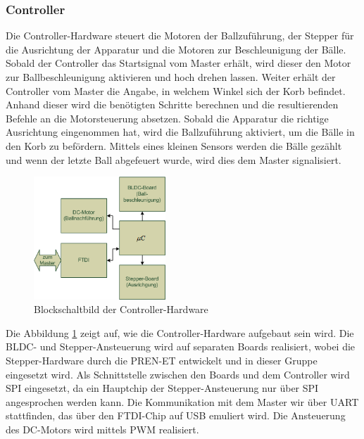 \subsubsection{Controller}
\label{sec:Controller}
	Die Controller-Hardware steuert die Motoren der Ballzuführung, der Stepper für die Ausrichtung der Apparatur und die Motoren zur Beschleunigung der Bälle. Sobald der Controller das Startsignal vom Master erhält, wird dieser den Motor zur Ballbeschleunigung aktivieren und hoch drehen lassen. Weiter erhält der Controller vom Master die Angabe, in welchem Winkel sich der Korb befindet. Anhand dieser wird die benötigten Schritte berechnen und die resultierenden Befehle an die Motorsteuerung absetzen. Sobald die Apparatur die richtige Ausrichtung eingenommen hat, wird die Ballzuführung aktiviert, um die Bälle in den Korb zu befördern. Mittels eines kleinen Sensors werden die Bälle gezählt und wenn der letzte Ball abgefeuert wurde, wird dies dem Master signalisiert.\\
	\begin{figure}
		\centering
		\includegraphics[width=0.44\textwidth]{Enddokumentation/Loesungskonzept/Bilder/Blockschaltbild_Controller.png}
		\caption{Blockschaltbild der Controller-Hardware}
		\label{fig:Blockschaltbild_Controller}
	\end{figure}
	Die Abbildung \ref{fig:Blockschaltbild_Controller} zeigt auf, wie die Controller-Hardware aufgebaut sein wird. Die BLDC- und Stepper-Ansteuerung wird auf separaten Boards realisiert, wobei die Stepper-Hardware durch die PREN-ET
	entwickelt und in dieser Gruppe eingesetzt wird. Als Schnittstelle zwischen den Boards und dem Controller wird SPI eingesetzt, da ein Hauptchip der Stepper-Ansteuerung nur über SPI angesprochen werden kann. Die Kommunikation mit dem Master wir über UART stattfinden, das über den FTDI-Chip auf USB emuliert wird. Die Ansteuerung des DC-Motors wird mittels PWM realisiert.